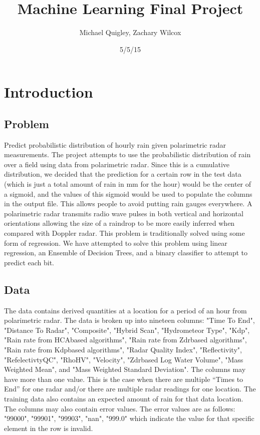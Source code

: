 \documentclass[pdftex,a4paper,12pt]{article}
\title{Machine Learning Final Project}
\author{Michael Quigley, Zachary Wilcox}
\date{5/5/15}
\begin{document}
\maketitle
\section{Introduction}
\subsection{Problem}
Predict probabilistic distribution of hourly rain given polarimetric radar measurements.
The project attempts to use the probabilistic distribution of rain over a field using data from
polarimetric radar. Since this is a cumulative distribution, we decided that the prediction for a certain row in the test data (which is just a total amount of rain in mm for the hour) would be the center of a sigmoid, and the values of this sigmoid would be used to populate the columns in the output file. This allows people to avoid putting rain gauges everywhere. A polarimetric
radar transmits radio wave pulses in both vertical and horizontal orientations allowing the size
of a raindrop to be more easily inferred when compared with Doppler radar.
This problem is traditionally solved using some form of regression.  We have attempted to solve this problem using linear regression, an Ensemble of Decision Trees, and a binary classifier to attempt to predict each bit.

\subsection{Data}
The data contains derived quantities at a location for a period of an hour from polarimetric
radar. The data is broken up into nineteen columns: "Time To End", "Distance To Radar",
"Composite", "Hybrid Scan", "Hydrometeor Type", "Kdp", "Rain rate from HCAbased
algorithms", "Rain rate from Zdrbased
algorithms", "Rain rate from Kdpbased
algorithms",
"Radar Quality Index", "Reflectivity", "RefelectivtyQC", "RhoHV", "Velocity", "Zdrbased
Log
Water Volume", "Mass Weighted Mean", and "Mass Weighted Standard Deviation".
The columns may have more than one value. This is the case when there are multiple “Times
to End” for one radar and/or there are multiple radar readings for one location. The training
data also contains an expected amount of rain for that data location. The columns may also
contain error values. The error values are as follows: "99000",
"99901",
"99903",
"nan",
"999.0" which indicate the value for that specific element in the row is invalid.
\end{document}
